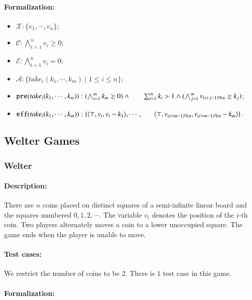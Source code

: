 \documentclass[review]{elsarticle}
\newcommand{\set}[1]{\{ #1 \}}
\newcommand{\tuple}[1]{\langle {#1} \rangle}
\newcommand{\true}{\top}
\newcommand{\statevar}{\mathcal{X}}
\newcommand{\act}{\mathcal{A}}
\newcommand{\constraint}{\mathcal{C}}
\newcommand{\estate}{\mathcal{E}}
\newcommand{\pre}{\mathtt{pre}}
\newcommand{\eff}{\mathtt{eff}}
\begin{document}
\paragraph{Formalization:}
\begin{itemize}
	\item $\statevar: \set{v_1, \cdots, v_n}$;
	\item $\constraint: \bigwedge_{i=1}^{n} v_i \ge 0$;
	\item $\estate: \bigwedge_{i=1}^{n} v_i = 0$;
	\item $\act:\set{take_i(k_1, \cdots, k_m) {\mid} 1 \le i \le n}$;
	\item $\pre(take_i(k_1, \cdots, k_m)) : (\bigwedge_{i=1}^{m} k_m\ge 0) \wedge \\ \hspace*{6mm}
	\sum_{i=1}^{m} k_i > 1 \wedge 
	(\bigwedge_{j=1}^{m} v_{(i+j-1)\%n}\ge k_j)$;
	\item $\eff(take_i(k_1, \cdots, k_m)) : \set{\tuple{\true, v_i, v_i - k_1},\cdots, \\\hspace*{6mm}
		\tuple{\true, v_{(i+m-1)\%n}, v_{(i+m-1)\%n} - k_m}}$.
\end{itemize}

\subsection{Welter Games}
\subsubsection{Welter \protect\cite{Wel1952}}

\paragraph{Description:} 
There are $n$ coins placed on distinct squares of a semi-infinite linear board and the squares numbered $0, 1, 2, \cdots$.
The variable $v_i$ denotes the position of the $i$-th coin.
Two players alternately moves a coin to a lower unoccupied square. 
The game ends when the player is unable to move.
\paragraph{Test cases:}
We restrict the number of coins to be $2$. 
There is $1$ test case in this game.
\paragraph{Formalization:}
\end{document}
